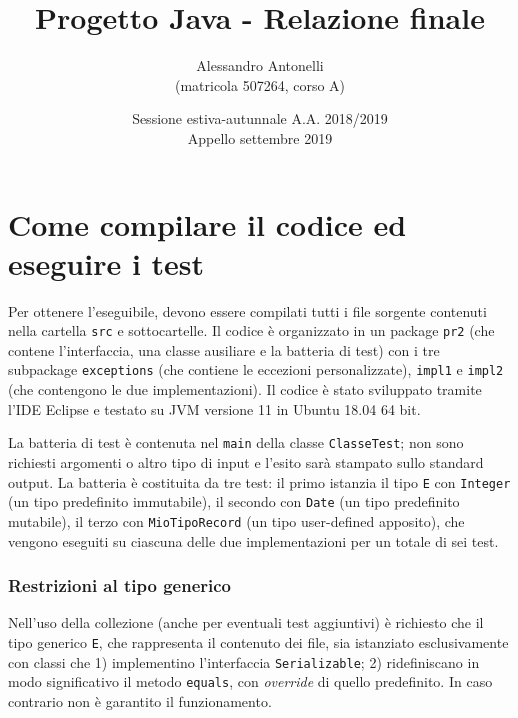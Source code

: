 \documentclass[a4paper,10pt]{article}
\title { \vspace{-1.9cm}{\small Università di Pisa\\Corso di Programmazione II (273AA)\\[0.6cm]}Progetto Java - Relazione finale }
\author { Alessandro Antonelli\\(matricola 507264, corso A) }
\date { Sessione estiva-autunnale A.A. 2018/2019\\Appello settembre 2019 }
\begin{document}
 \maketitle
 
 \vspace{-1cm}
 \section{ Come compilare il codice ed eseguire i test }
 \vspace{-0.2cm}
 
 Per ottenere l'eseguibile, devono essere compilati tutti i file sorgente contenuti nella cartella \texttt{src} e sottocartelle. Il codice è organizzato in un package \texttt{pr2} (che contene l'interfaccia, una classe ausiliare e la batteria di test) con i tre subpackage \texttt{exceptions} (che contiene le eccezioni personalizzate), \texttt{impl1} e \texttt{impl2} (che contengono le due implementazioni). Il codice è stato sviluppato tramite l'IDE Eclipse e testato su JVM versione 11 in Ubuntu 18.04 64 bit.
 
 La batteria di test è contenuta nel \texttt{main} della classe \texttt{ClasseTest}; non sono richiesti argomenti o altro tipo di input e l'esito sarà stampato sullo standard output. La batteria è costituita da tre test: il primo istanzia il tipo \texttt{E} con \texttt{Integer} (un tipo predefinito immutabile), il secondo con \texttt{Date} (un tipo predefinito mutabile), il terzo con \texttt{MioTipoRecord} (un tipo user-defined apposito), che vengono eseguiti su ciascuna delle due implementazioni per un totale di sei test.
 
 \vspace{-0.3cm}
 \subsubsection*{ Restrizioni al tipo generico }
 \vspace{-0.1cm}
 
 Nell'uso della collezione (anche per eventuali test aggiuntivi) è richiesto che il tipo generico \texttt{E}, che rappresenta il contenuto dei file, sia istanziato esclusivamente con classi che 1) implementino l'interfaccia \texttt{Serializable}; 2) ridefiniscano in modo significativo il metodo \texttt{equals}, con \textit{override} di quello predefinito. In caso contrario non è garantito il funzionamento.
 
\end{document}
